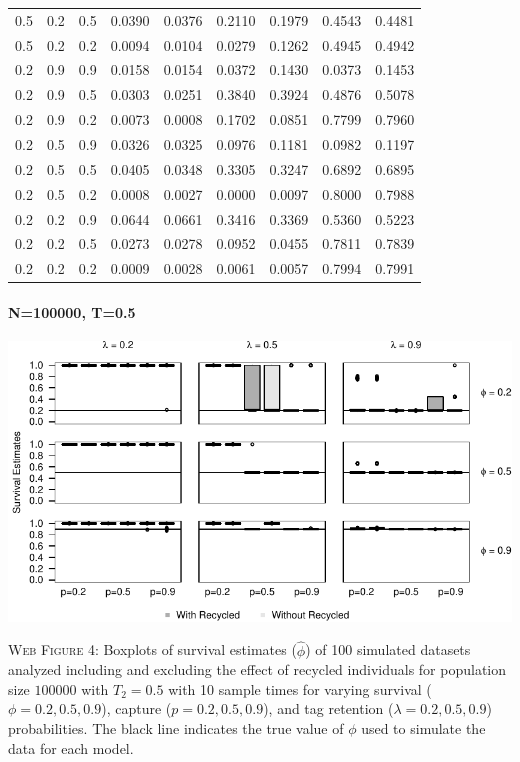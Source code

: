 \documentclass[]{article}
\let\oldparagraph\paragraph
\renewcommand{\paragraph}[1]{\oldparagraph{#1}\mbox{}}
\begin{document}
\begin{table}[ht]
{\begin{tabular}{rrrrrrrrr}
  0.5 & 0.2 & 0.5 & 0.0390 & 0.0376 & 0.2110 & 0.1979 & 0.4543 & 0.4481 \\ 
  0.5 & 0.2 & 0.2 & 0.0094 & 0.0104 & 0.0279 & 0.1262 & 0.4945 & 0.4942 \\ 
  0.2 & 0.9 & 0.9 & 0.0158 & 0.0154 & 0.0372 & 0.1430 & 0.0373 & 0.1453 \\ 
  0.2 & 0.9 & 0.5 & 0.0303 & 0.0251 & 0.3840 & 0.3924 & 0.4876 & 0.5078 \\ 
  0.2 & 0.9 & 0.2 & 0.0073 & 0.0008 & 0.1702 & 0.0851 & 0.7799 & 0.7960 \\ 
  0.2 & 0.5 & 0.9 & 0.0326 & 0.0325 & 0.0976 & 0.1181 & 0.0982 & 0.1197 \\ 
  0.2 & 0.5 & 0.5 & 0.0405 & 0.0348 & 0.3305 & 0.3247 & 0.6892 & 0.6895 \\ 
  0.2 & 0.5 & 0.2 & 0.0008 & 0.0027 & 0.0000 & 0.0097 & 0.8000 & 0.7988 \\ 
  0.2 & 0.2 & 0.9 & 0.0644 & 0.0661 & 0.3416 & 0.3369 & 0.5360 & 0.5223 \\ 
  0.2 & 0.2 & 0.5 & 0.0273 & 0.0278 & 0.0952 & 0.0455 & 0.7811 & 0.7839 \\ 
  0.2 & 0.2 & 0.2 & 0.0009 & 0.0028 & 0.0061 & 0.0057 & 0.7994 & 0.7991 \\ 
   \hline
\end{tabular}
}
\endgroup
\end{table}

\newpage

\paragraph{N=100000, T=0.5}\label{n100000-t0.5}

\includegraphics{Appendix_BW_files/figure-latex/figure4_survival_GJSTL3-1.pdf}

\textsc{Web Figure 4:} Boxplots of survival estimates (\(\hat{\phi}\))
of 100 simulated datasets analyzed including and excluding the effect of
recycled individuals for population size \(100000\) with \(T_2=0.5\)
with 10 sample times for varying survival (\(\phi=0.2,0.5,0.9\)),
capture (\(p=0.2,0.5,0.9\)), and tag retention (\(\lambda=0.2,0.5,0.9\))
probabilities. The black line indicates the true value of \(\phi\) used
to simulate the data for each model.
\end{document}
